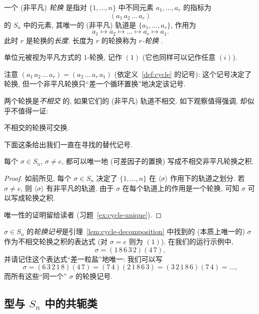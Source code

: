 \begin{definition}
\label{def:cycle}
一个 (非平凡) \emph{轮换}%
是指对 $\{1,\dots,n\}$ 中不同元素 $a_1,\dots,a_r$ 的指标为
\[
(a_1\, a_2\, \dots\, a_r)
\]
的 $S_n$ 中的元素, 其唯一的 (非平凡) 轨道是 $\{a_1,\dots,a_r\}$, 作用为
\[
a_1 \mapsto a_2 \mapsto \dots \mapsto a_r \mapsto a_1.
\]
此时 $r$ 是轮换的\emph{长度}. 长度为 $r$ 的轮换称为 \emph{$r$-轮换}%
%
.
\end{definition}

单位元被视为平凡方式的 $1$-轮换, 记作 $(1)$ (它也同样可以记作任意 $(i)$).

注意 $(a_1\, a_2\, \dots\, a_r) = (a_2\, \dots\, a_r\, a_1)$ (依定义~\ref{def:cycle} 的记号): 这个记号决定了轮换, 但一个非平凡轮换只``差一个循环置换''地决定该记号.

两个轮换是\emph{不相交}%
的, 如果它们的 (非平凡) 轨道不相交. 如下观察值得强调, 却似乎不值得一证:

\begin{lemma}
\label{lem:disjoint-cycles-commute}
不相交的轮换可交换.
\end{lemma}

下面这条给出我们一直在寻找的替代记号.

\begin{lemma}
\label{lem:cycle-decomposition}
每个 $\sigma \in S_n$, $\sigma \neq e$, 都可以唯一地 (可差因子的置换) 写成不相交非平凡轮换之积.
\end{lemma}

\begin{proof}
如前所见, 每个 $\sigma \in S_n$ 决定了 $\{1,\dots,n\}$ 在 $\langle\sigma\rangle$ 作用下的轨道之划分. 若 $\sigma \neq e$, 则 $\langle\sigma\rangle$ 有非平凡的轨道. 由于 $\sigma$ 在每个轨道上的作用是一个轮换, 可知 $\sigma$ 可以写成轮换之积.

唯一性的证明留给读者 (习题~\ref{ex:cycle-unique}).
\end{proof}

$\sigma \in S_n$ 的\emph{轮换记号}是引理~\ref{lem:cycle-decomposition} 中找到的 (本质上唯一的) $\sigma$ 作为不相交轮换之积的表达式 (对 $\sigma = e$ 则为 $(1)$). 在我们的运行示例中,
\[
\sigma = (1\,8\,6\,3\,2)(4\,7),
\]
并请记住这个表达式``差一粒盐''地唯一: 我们可以写
\[
\sigma = (6\,3\,2\,1\,8)(4\,7) = (7\,4)(2\,1\,8\,6\,3) = (3\,2\,1\,8\,6)(7\,4) = \dots,
\]
而所有这些``同一个'' $\sigma$ 的轮换记号.

\subsection{型与 \texorpdfstring{$S_n$}{Sn} 中的共轭类}
\label{subsec:symmetric-group-type}

